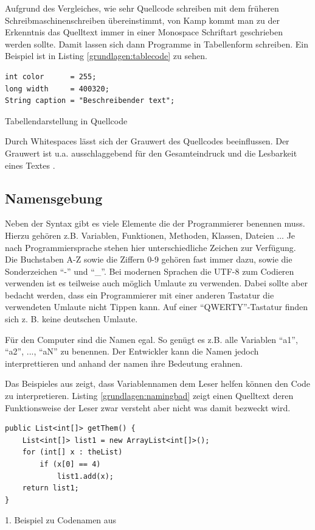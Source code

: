 Aufgrund des Vergleiches, wie sehr Quellcode schreiben mit dem früheren Schreibmaschinenschreiben übereinstimmt, von Kamp\cite{Kamp} kommt man zu der Erkenntnis das Quelltext immer in einer Monospace Schriftart geschrieben werden sollte\cite[S. 2]{Green}. Damit lassen sich dann Programme in Tabellenform schreiben. Ein Beispiel ist in Listing \ref{grundlagen:tablecode} zu sehen.

\begin{listing}[H]
    \begin{verbatim}
int color      = 255;
long width     = 400320;
String caption = "Beschreibender text";
    \end{verbatim}
    \caption{Tabellendarstellung in Quellcode}
    \label{grundlagen:tablecode}
\end{listing}

Durch Whitespaces lässt sich der Grauwert des Quellcodes beeinflussen.
Der Grauwert ist u.a. ausschlaggebend für den Gesamteindruck und die Lesbarkeit
eines Textes \cite{Beinert}.

\subsection{Namensgebung}

Neben der Syntax gibt es viele Elemente die der Programmierer benennen muss.
Hierzu gehören z.B. Variablen, Funktionen, Methoden, Klassen, Dateien ...
Je nach Programmiersprache stehen hier unterschiedliche Zeichen zur Verfügung.
Die Buchstaben A-Z sowie die Ziffern 0-9 gehören fast immer dazu, sowie die
Sonderzeichen \enquote{-} und \enquote{\_}. Bei modernen Sprachen die UTF-8
zum Codieren verwenden ist es teilweise auch möglich Umlaute zu verwenden.
Dabei sollte aber bedacht werden, dass ein Programmierer mit einer anderen
Tastatur die verwendeten Umlaute nicht Tippen kann. Auf einer \enquote{QWERTY}-Tastatur
finden sich z. B. keine deutschen Umlaute.

Für den Computer sind die Namen egal. So genügt es z.B. alle Variablen \enquote{a1},
\enquote{a2}, ..., \enquote{aN} zu benennen. Der Entwickler kann die Namen jedoch interprettieren und
anhand der namen ihre Bedeutung erahnen.

Das Beispieles aus \cite[S. 46-47]{Martin} zeigt, dass Variablennamen dem
Leser helfen können den Code zu interpretieren.
Listing \ref{grundlagen:namingbad} zeigt einen Quelltext deren Funktionsweise
der Leser zwar versteht aber nicht was damit bezweckt wird.

\begin{listing}
    \begin{verbatim}
public List<int[]> getThem() {
    List<int[]> list1 = new ArrayList<int[]>();
    for (int[] x : theList)
        if (x[0] == 4)
            list1.add(x);
    return list1;
}
    \end{verbatim}
    \caption{1. Beispiel zu Codenamen aus \cite[S. 46]{Martin}}
    \label{grundlagen:namingbad}
\end{listing}

